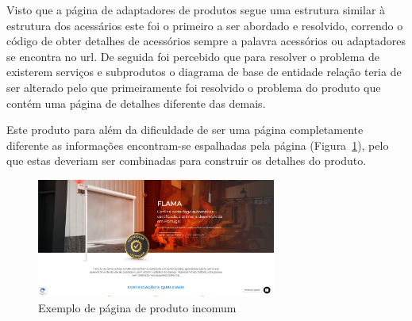 \newpage

Visto que a página de adaptadores de produtos segue uma estrutura similar à estrutura dos acessários este foi o primeiro a ser abordado e resolvido, correndo o código de obter detalhes de acessórios sempre a 
palavra acessórios ou adaptadores se encontra no url. De seguida foi percebido que para resolver o problema de existerem serviços e subprodutos o diagrama de base de entidade relação teria de ser alterado pelo que
primeiramente foi resolvido o problema do produto que contém uma página de detalhes diferente das demais. 

Este produto para além da dificuldade de ser uma página completamente diferente as informações encontram-se espalhadas pela página (Figura~\ref*{fig:60}), pelo que estas deveriam ser combinadas para construir os detalhes do produto.

\begin{figure}[htb]
    \centering
    
    \includegraphics[width=0.7\textwidth]{images/implementacao/scraper/flama.png}
    \caption{Exemplo de página de produto incomum}
    \label{fig:60}
\end{figure}
